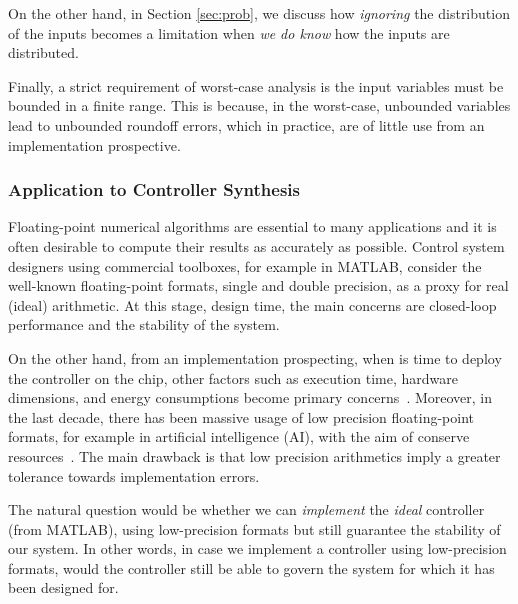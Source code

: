 On the other hand, in Section \ref{sec:prob}, we discuss how \emph{ignoring} the distribution of the inputs becomes a limitation when \emph{we do know} how the inputs are distributed.
%

Finally, a strict requirement of worst-case analysis is the input variables must be bounded  in a finite range. This is because, in the worst-case, unbounded variables lead to unbounded roundoff errors, which in practice, are of little use from an implementation prospective.
\subsubsection{Application to Controller Synthesis}
Floating-point numerical algorithms are essential to many applications and it is often desirable to compute their results as accurately as possible.
%
Control system designers using commercial toolboxes, for example in MATLAB, consider the well-known floating-point formats, single and double precision, as a proxy for real (ideal) arithmetic. 
%
At this stage, design time, the main concerns are closed-loop performance and the stability of the system.
%

%
%
On the other hand, from an implementation prospecting, when is time to deploy the controller on the chip, other factors such as execution time, hardware dimensions, and energy consumptions become primary concerns~\cite{suardi}.
%
Moreover, in the last decade, there has been massive usage of low precision floating-point formats, for example in artificial intelligence (AI), with the aim of conserve resources~\cite{fppower}.
%
The main drawback is that low precision arithmetics imply a greater tolerance towards implementation errors.
%

The natural question would be whether we can \emph{implement} the \emph{ideal} controller (from MATLAB), using low-precision formats but still guarantee the stability of our system.
%
In other words, in case we implement a controller using low-precision formats, would the controller still be able to govern the system for which it has been designed for.

